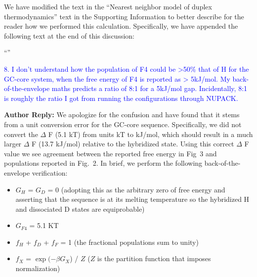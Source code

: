\documentclass[11pt,a4paper]{letter} %
\newcommand*{\rood}[1]{{\color{red}{#1}}}
\begin{document}
We have modified the text in the ``Nearest neighbor model of duplex thermodynamics'' text in the Supporting Information to better describe for the reader how we performed this calculation. Specifically, we have appended the following text at the end of this discussion:

``\rood{In applying the NN model to each macrostate, we made the simplifying assumption that the ensemble of microstates constituting each macrostate could be represented by a single pattern of Watson-Crick base pairing that are schematically illustrated in Fig.~2a. Indeed, each macrostate is composed of an ensemble of partially frayed states with higher free energy contributions than the intact pattern. However, when averaging across the frayed contributions of all microstates in each macrostate, we have found that in all cases incorporating additional NN configurations changes $\Delta$ F values (relative the corresponding partially frayed H state) by $<$ 1 kJ/mol when compared to using a single microstate. Furthermore, treating termini fraying as complete removal of a nearest neighbor pair is a crude approximation since the model was not intended to incorporate fraying. Given the extent to which a single NN representation captures each macrostate (which is further demonstrated in Fig.~S5), we have elected to maintain a single microstate free energy estimate for each macrostate}''

\textcolor{blue}{8. I don't understand how the population of F4 could be >50\% that of H for the GC-core system, when the free energy of F4 is reported as > 5kJ/mol. My back-of-the-envelope maths predicts a ratio of 8:1 for a 5kJ/mol gap. Incidentally, 8:1 is roughly the ratio I got from running the configurations through NUPACK.}

\textbf{Author Reply:}  We apologize for the confusion and have found that it stems from a unit conversion error for the GC-core sequence. Specifically, we did not convert the $\Delta$ F (5.1 kT) from units kT to kJ/mol, which should result in a much larger $\Delta$ F (13.7 kJ/mol) relative to the hybridized state. 
Using this correct $\Delta$ F value we see agreement between the reported free energy in Fig~3 and populations reported in Fig.~2. In brief, we perform the following back-of-the-envelope verification:

\begin{itemize}
\item $G_H$ = $G_D$ = 0 (adopting this as the arbitrary zero of free energy and asserting that the sequence is at its melting temperature so the hybridized H and dissociated D states are equiprobable)
\item $G_{F4}$ = 5.1 KT
\item $f_H$ + $f_D$ + $f_F$ = 1 (the fractional populations sum to unity)
\item $f_X$ = $\exp (-\beta G_X$) / $Z$ ($Z$ is the partition function that imposes normalization)
\end{itemize}
\end{document}
